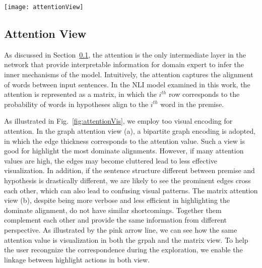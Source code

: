 \begin{figure*}[htbp]
\centering
\vspace{-2mm}
\texttt{[image: attentionView]}
\vspace{-6mm}
\caption{
Attention visualization. In the graph attention view (a), a bipartite graph encoding is adopted, in which the edge thickness corresponds to the attention value. In the matrix attention view (b), the $i^{th}$ row corresponds to the probability of words in hypotheses align to the $i^{th}$ word in the premise.
The user can alter the attention values via the pop up interface illustrated in (c).
}
\label{fig:attentionVis}
\end{figure*}

\subsection{Attention View}
\label{sec:attention}
As discussed in Section~\ref{sec:attention}, the attention is the only intermediate layer in the network that provide interpretable information for domain expert to infer the inner mechanisms of the model.
%
Intuitively, the attention captures the alignment of words between input sentences. In the NLI model examined in this work, the attention is represented as a matrix, in which the $i^{th}$ row corresponds to the probability of words in hypotheses align to the $i^{th}$ word in the premise.

As illustrated in Fig.~\ref{fig:attentionVis}, we employ too visual encoding for attention. In the graph attention view (a), a bipartite graph encoding is adopted, in which the edge thickness corresponds to the attention value. Such a view is good for highlight the most dominate alignments. However, if many attention values are high, the edges may become cluttered lead to less effective visualization. In addition, if the sentence structure different between premise and hypothesis is drastically different, we are likely to see the prominent edges cross each other, which can also lead to confusing visual patterns. The matrix attention view (b), despite being more verbose and less efficient in highlighting the dominate alignment, do not have similar shortcomings. Together them complement each other and provide the same information from different perspective. As illustrated by the pink arrow line, we can see how the same attention value is visualization in both the grpah and the matrix view.
To help the user recongnize the correspondence during the exploration, we enable the linkage between highlight actions in both view.

